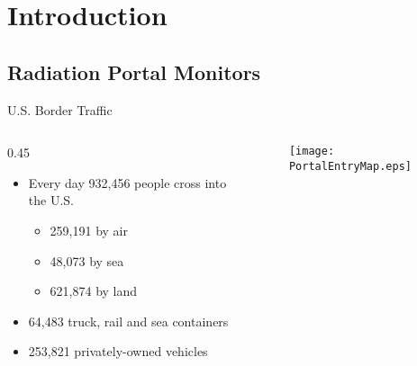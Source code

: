 

\section{Introduction}

\subsection{Radiation Portal Monitors}

\begin{frame}{U.S. Border Traffic}
\begin{columns}[onlytextwidth]
\begin{column} {0.45\textwidth}
 
  \begin{itemize}
  \item Every day 932,456 people cross into the U.S. \cite{cpb_typical_2012}
    \begin{itemize}
    	\item 259,191 by air
	\item 48,073 by sea
	\item 621,874 by land
    \end{itemize}
  \item 64,483 truck, rail and sea containers \cite{cpb_typical_2012}
 \item 253,821 privately-owned vehicles \cite{cpb_typical_2012}
  \end{itemize}
\end{column}
\begin{column}{0.45\textwidth}
\centering
\begin{figure}
		\texttt{[image: PortalEntryMap.eps]}
\end{figure}
\end{column}
\end{columns}
\end{frame}

